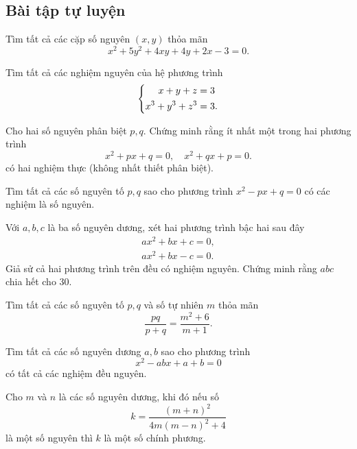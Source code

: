 \subsection*{Bài tập tự luyện}

\begin{btt}
Tìm tất cả các cặp số nguyên $(x,y)$ thỏa mãn
$$x^2+5y^2+4xy+4y+2x-3=0.$$
\end{btt}

\begin{btt}
Tìm tất cả các nghiệm nguyên của hệ phương trình
$$\left\{\begin{aligned}x+y+z&=3 \\ x^3+y^3+z^3&=3.\end{aligned}\right.$$
\end{btt}

\begin{btt}
Cho hai số nguyên phân biệt $p,q.$ Chứng minh rằng ít nhất một trong hai phương trình
$$x^2+px+q=0,\quad x^2+qx+p=0.$$
có hai nghiệm thực (không nhất thiết phân biệt).
\end{btt}

\begin{btt}
Tìm tất cả các số nguyên tố $p,q$ sao cho phương trình $x^2-px+q=0$ có các nghiệm là số nguyên.
\end{btt}

\begin{btt}
Với $a,b,c$ là ba số nguyên dương, xét hai phương trình bậc hai sau đây
\begin{align*}
    ax^2+bx+c=0,\\
    ax^2+bx-c=0.
\end{align*}
Giả sử cả hai phương trình trên đều có nghiệm nguyên. Chứng minh rằng $abc$ chia hết cho $30.$
\end{btt}

\begin{btt}
Tìm tất cả các số nguyên tố $p,q$ và số tự nhiên $m$ thỏa mãn
$$\dfrac{pq}{p+q}=\dfrac{m^2+6}{m+1}.$$
\end{btt}

\begin{btt}
Tìm tất cả các số nguyên dương $a,b$ sao cho phương trình
$$x^2-abx+a+b=0$$
có tất cả các nghiệm đều nguyên.
\end{btt}

\begin{btt}
Cho \(m\) và \(n\) là các số nguyên dương, khi đó nếu số 
\[ k=\dfrac{(m+n)^2}{4m(m-n)^2+4}\]
là một số nguyên thì \(k\) là một số chính phương.
\end{btt}


